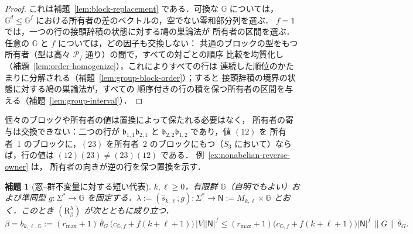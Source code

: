 \documentclass[11pt,a4paper]{ltjsarticle}
\numberwithin{equation}{section}
\theoremstyle{plain}
\newtheorem{lemma}[theorem]{補題}
\theoremstyle{definition}
\theoremstyle{remark}
\theoremstyle{plain}
\begin{document}
\begin{proof}
これは補題~\ref{lem:block-replacement} である．可換な ${\mathbb G}$ については，
${\mathbb G}^d\le {\mathbb G}^f$ における所有者の差のベクトルの，空でない零和部分列を選ぶ．
$f=1$ では，一つの行の接頭辞積の状態に対する鳩の巣論法が
所有者の区間を選ぶ．任意の ${\mathbb G}$ と $f$ については，どの因子も交換しない：
共通のブロックの型をもつ所有者（型は高々 $\mathcal P_f$ 通り）の間で，すべての対ごとの順序
比較を均質化し（補題~\ref{lem:order-homogenize}），これによりすべての行は
連続した順位のかたまりに分解される（補題~\ref{lem:group-block-order}）；すると
接頭辞積の境界の状態に対する鳩の巣論法が，すべての
順序付きの行の積を保つ所有者の区間を与える（補題~\ref{lem:group-interval}）．
\end{proof}

個々のブロックや所有者の値は置換によって保たれる必要はなく，
所有者の寄与は交換できない：二つの行が
$\mathfrak b_{1,1}\mathfrak b_{2,1}$ と $\mathfrak b_{2,2}\mathfrak b_{1,2}$ であり，値 $(12)$ を
所有者~1 のブロックに，$(23)$ を所有者~2 のブロックにもつ（$S_3$ において）ならば，行の値は
$(12)(23)\ne(23)(12)$ である．
例~\ref{ex:nonabelian-reverse-owner} は，
所有者の向きが逆の行を保つ置換を示す．

\begin{lemma}[窓--群不変量に対する短い代表]
\label{lem:marked-heavy-window-group}
$k,\ell\ge0$，有限群 ${\mathbb G}$（自明でもよい）および準同型
$g:\Sigma^*\to {\mathbb G}$ を固定する．$\lambda:=(\widehat s_{k,\ell},g):\Sigma^*\to
\mathsf N:=M_{k,\ell}\times {\mathbb G}$ とおく．このとき $(\mathrm R_\beta^\lambda)$ が次とともに成り立つ．
\[
 \beta=b_{k,\ell,{\mathbb G}}:=(r_{\max}+1)\,\bar\theta_G\,\bigl(c_{{\mathbb G},f}+f(k+\ell+1)\bigr)\,|V||\mathsf N|^f
 \le(r_{\max}+1)\bigl(c_{{\mathbb G},f}+f(k+\ell+1)\bigr)|\mathsf N|^f\,\|G\|\,\bar\theta_G .
\]
\end{lemma}
\end{document}
